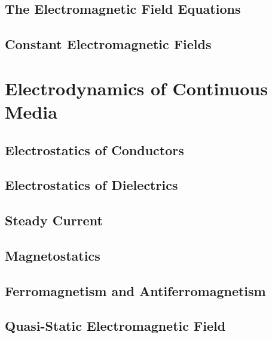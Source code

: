 \documentclass[
    ebook,
    11pt,
    oneside,
    onecolumn,
    openright,
    final
]{memoir}
\numberwithin{equation}{section}
\begin{document}






\chapter[The EM Field Equations]{The Electromagnetic Field Equations}
\label{ch:06a}


% 

\chapter[Constant EM Fields]{Constant Electromagnetic Fields}
\label{ch:07a}

\part{Electrodynamics of Continuous Media}

\chapter{Electrostatics of Conductors}

\chapter{Electrostatics of Dielectrics}

\chapter{Steady Current}

\chapter{Magnetostatics}

\chapter{Ferromagnetism and Antiferromagnetism}

\chapter{Quasi-Static Electromagnetic Field}
\end{document}
